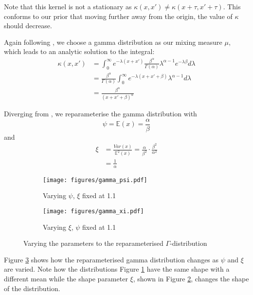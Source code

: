 \documentclass[a4paper,12pt,twoside,openright]{report}
\begin{document}
Note that this kernel is not a stationary as $\kappa(x, x') \neq \kappa(x + \tau, x' + \tau)$. This conforms to our prior that moving further away from the origin, the value of $\kappa$ should decrease.

Again following \cite{2014arXiv1406.3896S}, we choose a gamma distribution as our mixing measure $\mu$, which leads to an analytic solution to the integral:
\begin{align}
\kappa(x, x') &= \int_0^{\infty} e^{-\lambda(x+x')}\frac{\beta^\alpha}{\Gamma(\alpha)}\lambda^{\alpha -1}e^{-\lambda\beta} d\lambda\\
&=\frac{\beta^\alpha}{\Gamma(\alpha)}\int_0^\infty e^{-\lambda(x+x'+\beta)}\lambda^{\alpha-1}d\lambda\\
&=\frac{\beta^\alpha}{(x+x'+\beta)^\alpha}
\end{align}

Diverging from \cite{2014arXiv1406.3896S}, we reparameterise the gamma distribution with
\begin{equation}
\psi = \mathbb{E}(x) = \frac{\alpha}{\beta}
\end{equation}
and
\begin{align}
\xi &= \frac{Var(x)}{\mathbb{E}^2 (x)} = \frac{\alpha}{\beta^2} \cdot \frac{\beta^2}{\alpha^2}\\
&= \frac{1}{\alpha}
\end{align}

\begin{figure}
\centering
\begin{subfigure}{.5\textwidth}
  \centering
  \texttt{[image: figures/gamma\_psi.pdf]}
  \caption{Varying $\psi$, $\xi$ fixed at 1.1}
  \label{gammapsi}
\end{subfigure}%
\begin{subfigure}{.5\textwidth}
  \centering
  \texttt{[image: figures/gamma\_xi.pdf]}
  \caption{Varying $\xi$, $\psi$ fixed at 1.1}
  \label{gammaxi}
\end{subfigure}
\caption{Varying the parameters to the reparameterised $\Gamma$-distribution}
\label{gammadist}
\end{figure}


Figure \ref{gammadist} shows how the reparameterised gamma distribution changes as $\psi$ and $\xi$ are varied. Note how the distributions Figure \ref{gammapsi} have the same shape with a different mean while the shape parameter $\xi$, shown in Figure \ref{gammaxi}, changes the shape of the distribution.
\end{document}

